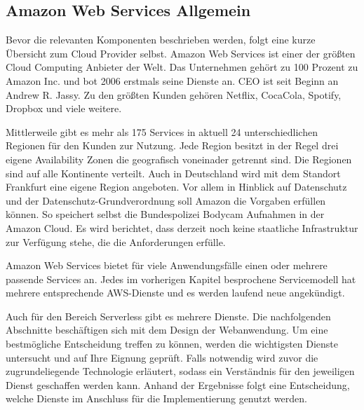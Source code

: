 \subsection{Amazon Web Services Allgemein}

Bevor die relevanten Komponenten beschrieben werden, folgt eine kurze Übersicht zum Cloud Provider selbst.
Amazon Web Services ist einer der größten Cloud Computing Anbieter der Welt. Das Unternehmen gehört zu 100 Prozent zu Amazon Inc. und bot 2006 erstmals seine Dienste an. CEO ist seit Beginn an Andrew R. Jassy.
Zu den größten Kunden gehören Netflix, CocaCola, Spotify, Dropbox und viele weitere. \cite[]{AWSAllgemein}

Mittlerweile gibt es mehr als 175 Services in aktuell 24 unterschiedlichen Regionen für den Kunden zur Nutzung.
Jede Region besitzt in der Regel drei eigene Availability Zonen die geografisch voneinader getrennt sind.
Die Regionen sind auf alle Kontinente verteilt.
Auch in Deutschland wird mit dem Standort Frankfurt eine eigene Region angeboten.
Vor allem in Hinblick auf Datenschutz und der Datenschutz-Grundverordnung soll Amazon die Vorgaben erfüllen können.
So speichert selbst die Bundespolizei Bodycam Aufnahmen in der Amazon Cloud.\cite[]{AWSPolizei}
Es wird berichtet, {}\glqq dass derzeit noch keine staatliche Infrastruktur zur Verfügung stehe, die die Anforderungen erfülle.\grqq{}
\cite[Abschnitt 1]{AWSPolizei}

Amazon Web Services bietet für viele Anwendungsfälle einen oder mehrere passende Services an.
Jedes im vorherigen Kapitel besprochene Servicemodell hat mehrere entsprechende AWS-Dienste und es werden laufend neue angekündigt.

Auch für den Bereich Serverless gibt es mehrere Dienste.
Die nachfolgenden Abschnitte beschäftigen sich mit dem Design der Webanwendung.
Um eine bestmögliche Entscheidung treffen zu können, werden die wichtigsten Dienste untersucht und auf Ihre Eignung geprüft.
Falls notwendig wird zuvor die zugrundeliegende Technologie erläutert, sodass ein Verständnis für den jeweiligen Dienst geschaffen werden kann.
Anhand der Ergebnisse folgt eine Entscheidung, welche Dienste im Anschluss für die Implementierung genutzt werden.




